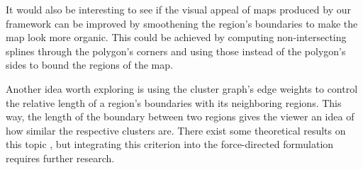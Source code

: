 It would also be interesting to see if the visual appeal of maps produced by our framework can be improved by smoothening the region's boundaries to make the map look more organic.
This could be achieved by computing non-intersecting splines through the polygon's corners and using those instead of the polygon's sides to bound the regions of the map.

Another idea worth exploring is using the cluster graph's edge weights to control the relative length of a region's boundaries with its neighboring regions.
This way, the length of the boundary between two regions gives the viewer an idea of how similar the respective clusters are.
There exist some theoretical results on this topic \cite{nollenburg2012edge}, but integrating this criterion into the force-directed formulation requires further research.
